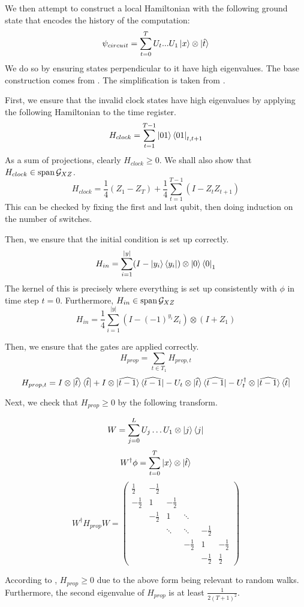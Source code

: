 We then attempt to construct a local Hamiltonian with the following ground state that encodes the history of the computation: $$\psi_{circuit}=\sum_{t=0}^TU_t...U_1\ket{x}\otimes\ket{\hat{t}}$$
We do so by ensuring states perpendicular to it have high eigenvalues. The base construction comes from \cite{kitaev2002classical}. The simplification is taken from \cite{PhysRevA.78.012352}.

First, we ensure that the invalid clock states have high eigenvalues by applying the following Hamiltonian to the time register.
$$H_{clock}=\sum_{t=1}^{T-1}\ket{01}\bra{01}_{t,t+1}$$
As a sum of projections, clearly $H_{clock}\geq 0$. We shall also show that $H_{clock}\in\operatorname*{\operatorname{span}}\mathcal{G}_{XZ}$.
$$H_{clock}=\frac{1}{4}(Z_1 - Z_T) + \frac{1}{4}\sum_{t=1}^{T-1}(I-Z_tZ_{t+1}) $$
This can be checked by fixing the first and last qubit, then doing induction on the number of switches.

Then, we ensure that the initial condition is set up correctly.
$$H_{in}=\sum_{i=1}^{|y|}(I-\ket{y_i}\bra{y_i})\otimes\ket{0}\bra{0}_1$$
The kernel of this is precisely where everything is set up consistently with $\phi$ in time step $t=0$. Furthermore, $H_{in}\in\operatorname*{\operatorname{span}}\mathcal{G}_{XZ}$
$$H_{in}=\frac{1}{4}\sum_{i=1}^{|y|}(I-(-1)^{y_i}Z_i)\otimes(I+Z_1)$$

Then, we ensure that the gates are applied correctly.
$$H_{prop}=\sum_{t\in T_1}H_{prop,t}$$
$$H_{prop,t}=I\otimes\ket{\widehat{t}}\bra{\widehat{t}}
	+I\otimes\ket{\widehat{t-1}}\bra{\widehat{t-1}}
	-U_t\otimes\ket{\widehat{t}}\bra{\widehat{t-1}}
	-U_t^\dagger\otimes\ket{\widehat{t-1}}\bra{\widehat{t}}$$

Next, we check that $H_{prop}\geq0$ by the following transform.

$$W=\sum_{j=0}^L U_j\ldots U_1\otimes\ket{j}\bra{j}$$
$$W^\dagger\phi=\sum_{t=0}^T\ket{x}\otimes\ket{\hat{t}}$$
$$W^\dagger H_{prop} W=
\begin{pmatrix}
	\frac{1}{2} & -\frac{1}{2} & & & &  \\
	-\frac{1}{2} & 1 & -\frac{1}{2} & & & \\
	& -\frac{1}{2} & 1 & \ddots & & \\
	& & \ddots & \ddots & -\frac{1}{2} & \\
	& & & -\frac{1}{2} & 1 & -\frac{1}{2} \\
	& & & & -\frac{1}{2} & \frac{1}{2}
\end{pmatrix}$$

According to \cite{2002quant.ph.10077A}, $H_{prop}\geq 0$ due to the above form being relevant to random walks. Furthermore, the second eigenvalue of $H_{prop}$ is at least $\frac{1}{2(T+1)^2}$.

